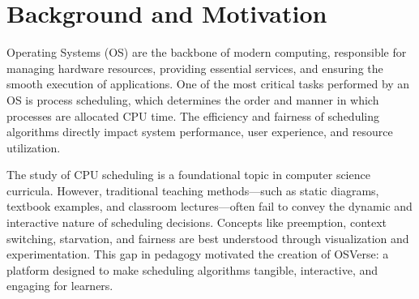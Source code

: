 \documentclass[12pt,a4paper,oneside]{report}
\begin{document}
\section*{Background and Motivation}
Operating Systems (OS) are the backbone of modern computing, responsible for managing hardware resources, providing essential services, and ensuring the smooth execution of applications. One of the most critical tasks performed by an OS is process scheduling, which determines the order and manner in which processes are allocated CPU time. The efficiency and fairness of scheduling algorithms directly impact system performance, user experience, and resource utilization.

The study of CPU scheduling is a foundational topic in computer science curricula. However, traditional teaching methods—such as static diagrams, textbook examples, and classroom lectures—often fail to convey the dynamic and interactive nature of scheduling decisions. Concepts like preemption, context switching, starvation, and fairness are best understood through visualization and experimentation. This gap in pedagogy motivated the creation of OSVerse: a platform designed to make scheduling algorithms tangible, interactive, and engaging for learners.
\end{document}
